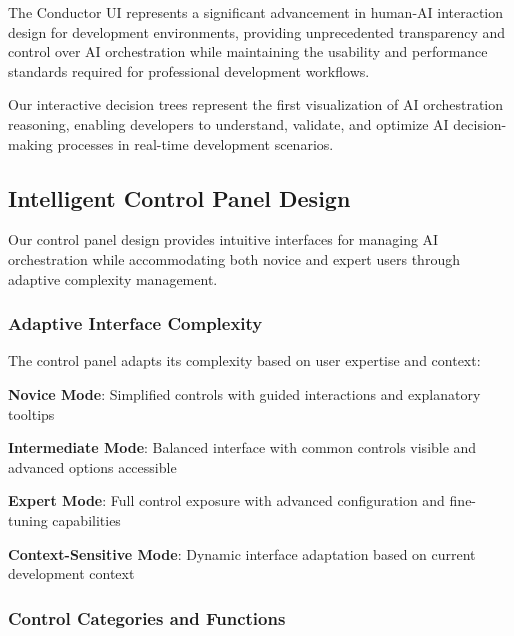 The Conductor UI represents a significant advancement in human-AI interaction design for development environments, providing unprecedented transparency and control over AI orchestration while maintaining the usability and performance standards required for professional development workflows.
\begin{infobox}[title=Decision Tree Innovation]
Our interactive decision trees represent the first visualization of AI orchestration reasoning, enabling developers to understand, validate, and optimize AI decision-making processes in real-time development scenarios.
\end{infobox}

\subsection*{Intelligent Control Panel Design}

Our control panel design provides intuitive interfaces for managing AI orchestration while accommodating both novice and expert users through adaptive complexity management.

\subsubsection*{Adaptive Interface Complexity}

The control panel adapts its complexity based on user expertise and context:

\begin{expandedlist}
    \item \textbf{Novice Mode}: Simplified controls with guided interactions and explanatory tooltips
    \item \textbf{Intermediate Mode}: Balanced interface with common controls visible and advanced options accessible
    \item \textbf{Expert Mode}: Full control exposure with advanced configuration and fine-tuning capabilities
    \item \textbf{Context-Sensitive Mode}: Dynamic interface adaptation based on current development context
\end{expandedlist}

\subsubsection*{Control Categories and Functions}

